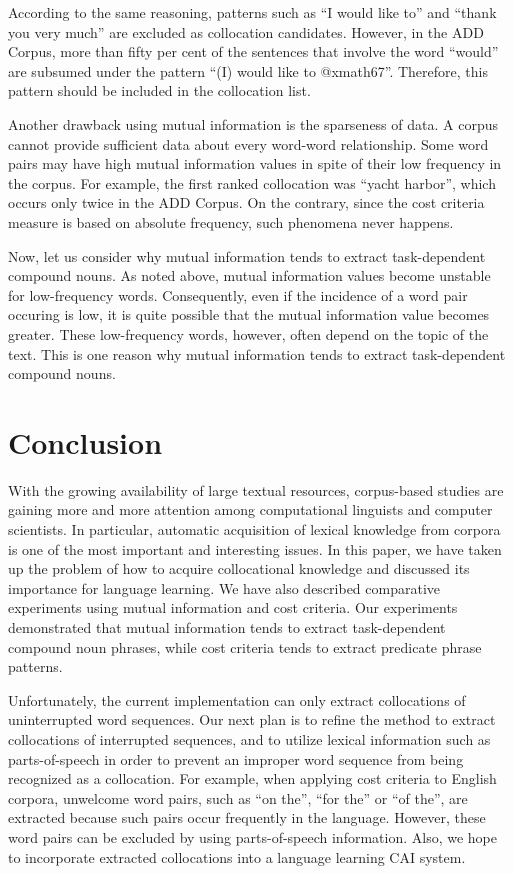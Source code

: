 According to the same reasoning,
patterns such as ``I would like to'' and ``thank you very much''
are excluded as collocation candidates.
However, in the ADD Corpus,
more than fifty per cent of the sentences that involve the word ``would''
are subsumed under the pattern ``(I) would like to @xmath67''.
Therefore, this pattern should be included in the collocation list.

Another drawback using mutual information is the sparseness of data.
A corpus cannot provide sufficient data about every word-word relationship.
Some word pairs may have high mutual information values
in spite of their low frequency in the corpus.
For example,
the first ranked collocation was ``yacht harbor'',
which occurs only twice in the ADD Corpus.
On the contrary, since the cost criteria measure is based on absolute frequency,
such phenomena never happens.

Now, let us consider why mutual information
tends to extract task-dependent compound nouns.
As noted above, mutual information values become unstable
for low-frequency words.
Consequently, even if the incidence of a word pair occuring is low,
it is quite possible that the mutual information value becomes greater.
These low-frequency words, however, often depend on the topic of the text.
This is one reason
why mutual information tends to extract task-dependent compound nouns.


\section{Conclusion}

With the growing availability of large textual resources,
corpus-based studies are gaining more and more attention among computational linguists
and computer scientists.
In particular, automatic acquisition of lexical knowledge from corpora
is one of the most important and interesting issues.
In this paper, we have taken up the problem of how to acquire collocational knowledge
and discussed its importance for language learning.
We have also described comparative experiments
using mutual information and cost criteria.
Our experiments demonstrated that
mutual information tends to
extract task-dependent compound noun phrases,
while cost criteria tends to extract predicate phrase patterns.

Unfortunately,
the current implementation can only extract collocations
of uninterrupted word sequences.
Our next plan is to refine the method to extract collocations
of interrupted sequences,
and to utilize lexical information such as parts-of-speech
in order to prevent an improper word sequence
from being recognized as a collocation.
For example, when applying cost criteria to English corpora,
unwelcome word pairs, such as ``on the'', ``for the'' or ``of the'',
are extracted
because such pairs occur frequently in the language.
However, these word pairs can be excluded by using
parts-of-speech information.
Also, we hope to incorporate extracted collocations
into a language learning CAI system.

\vspace*{2mm}

